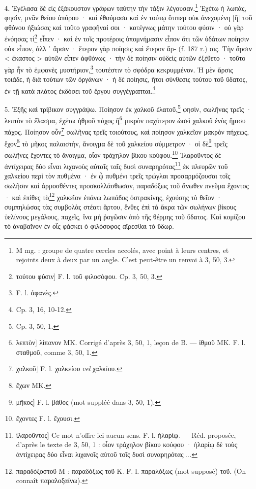 \documentclass[a4paper, 11pt, oneside, polutonikogreek, french]{article}
\begin{document}
4. Ἐγέλασα δὲ εἰς ἐξάκουστον γράφων ταύτην τὴν τάξιν λέγουσαν.\footnote{M mg. : groupe de quatre cercles accolés, avec point à leurs centres, et rejoints deux à deux par un angle. C'est peut-être un renvoi à 3, 50, 3.} Ἐχέτω ἡ λωπὰς, φησὶν, μνᾶν θείου ἀπύρου · καὶ ἐθαύμασα καὶ ἐν τούτῳ ὅτιπερ οὐκ ἀνεχομένη [ἢ] τοῦ φθόνου ἠξιώσας καὶ τοῦτο γραφῆναί σοι · κατέγνως μάτην τούτου φύσιν · οὐ γὰρ ἐνόησας τί\footnote{τούτου φύσιν] F. l. τοῦ φιλοσόφου. Cp. 3, 50, 3.} εἶπεν · καὶ ἐν τοῖς προτέροις ὑπομνήμασιν εἶπον ὅτι τῶν ὑδάτων ποίησιν οὐκ εἶπον, ἀλλ ᾽ ἄρσιν · ἕτερον γὰρ ποίησις καὶ ἕτερον ἄρ- (f. 187 r.) σις. Τὴν ἄρσιν < ἕκαστος > αὐτῶν εἶπεν ἀφθόνως · τὴν δὲ ποίησιν οὐδεὶς αὐτῶν ἐξέθετο · τοῦτο γὰρ ἦν τὸ ἐμφανὲς μυστήριον,\footnote{F. l. ἀφανὲς.} τουτέστιν τὸ σφόδρα κεκρυμμένον. Ἡ μὲν ἄρσις τοιάδε, ἡ διὰ τούτων τῶν ὀργάνων · ἡ δὲ ποίησις, ἤτοι σύνθεσις τούτου τοῦ ὕδατος, ἐν τῇ κατὰ πλάτος ἐκδόσει τοῦ ἔργου συγγέγραπται.\footnote{Cp. 3, 16, 10-12.}

5. Ἑξῆς καὶ τρίβικον συγγράψω. Ποίησον ἐκ χαλκοῦ ἐλατοῦ,\footnote{Cp. 3, 50, 1.} φησὶν, σωλῆνας τρεῖς · λεπτὸν τὸ ἔλασμα, ἐχέτω ἠθμοῦ πάχος ἢ\footnote{λεπτὸν] λίπανον MK. Corrigé d'après 3, 50, 1, leçon de B. --- ἰθμοῦ MK. F. l. σταθμοῦ, comme 3, 50, 1.} μικρὸν παχύτερον ὡσεὶ χαλκοῦ ἑνὸς ἥμισυ πάχος. Ποίησον οὖν\footnote{χαλκοῦ] F. l. χαλκείου \emph{vel} χαλκίου.} σωλῆνας τρεῖς τοιούτους, καὶ ποίησον χαλκεῖον μακρὸν πήχεως, ἔχον\footnote{ἔχων MK.} τὸ μῆκος παλαιστὴν, ἄνοιγμα δὲ τοῦ χαλκείου σύμμετρον · οἱ δὲ\footnote{μῆκος] F. l. βάθος (mot suppléé dans 3, 50, 1).} τρεῖς σωλῆνες ἔχοντες τὸ ἄνοιγμα, οἷον τράχηλον βίκου κούφου.\footnote{ἔχοντες F. l. ἔχουσι.} Ἱλαροῦντος δὲ ἀντίχειρας δύο εἶναι λιχανοὺς αὐταῖς ταῖς δυσὶ συναρηρότας\footnote{ἱλαροῦντος] Ce mot n'offre ici aucun sens. F. l. ἡλαρίῳ. --- Réd. proposée, d'après le texte de 3, 50, 1 : οἷον τράχηλον βίκου κούφου · ἡλαρίῳ δὲ τοὺς ἀντίχειρας δύο εἶναι λιχανοῖς αὐτοῦ τοῖς δυσὶ συναρηρότας ...} ἐκ πλευρῶν τοῦ χαλκείου περὶ τὸν πυθμένα · ἐν ᾧ πυθμένι τρεῖς τρώγλαι προσαρμόζουσαι τοῖς σωλῆσιν καὶ ἁρμοσθέντες προσκολλάσθωσαν, παραδόξως τοῦ ἄνωθεν πνεῦμα ἔχοντος · καὶ ἐπίθες τὸ\footnote{παραδόξοστοῦ M : παραδόξως τοῦ K. F. l. παραλόξως (mot supposé) τοῦ. (On connaît παραλοξαίνω).} χαλκεῖον ἐπάνω λωπάδος ὀστρακίνης, ἐχούσης τὸ θεῖον · συμπηλώσας τὰς συμβολὰς στέατι ἄρτου, ἔνθες ἐπὶ τὰ ἄκρα τῶν σωλήνων βίκους ὑελίνους μεγάλους, παχεῖς, ἵνα μὴ ῥαγῶσιν ἀπὸ τῆς θέρμης τοῦ ὕδατος. Καὶ κομίζου τὸ ἀναβαῖνον ἐν οἷς φάσκει ὁ φιλόσοφος αἴρεσθαι τὸ ὕδωρ.
\end{document}
